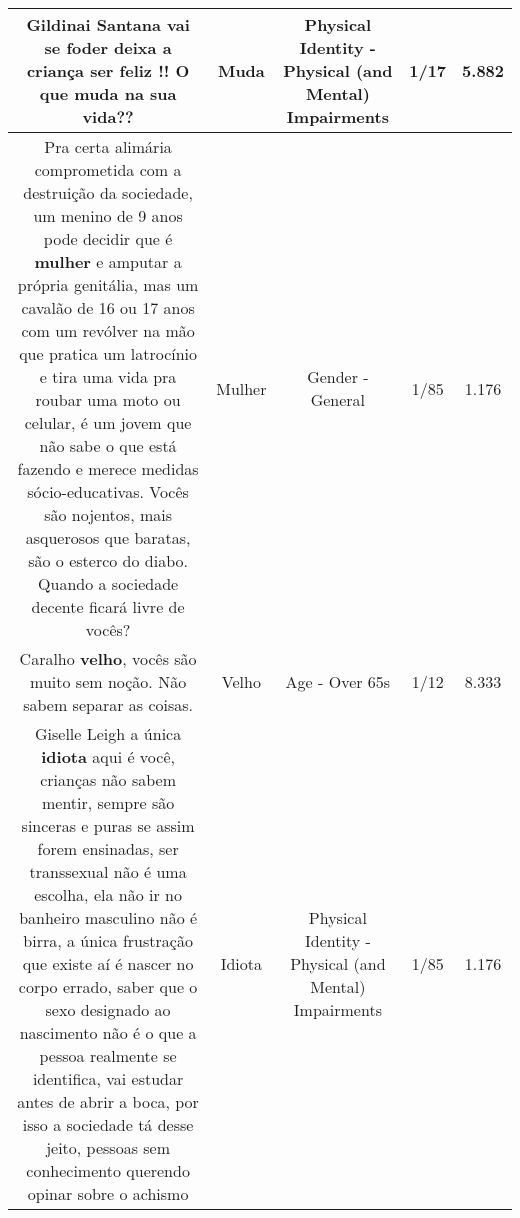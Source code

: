\documentclass[11pt]{article}
\newlength\mylength
\begin{document}
\begin{center}
\begin{longtable}{|C{.65\mylength}|C{.30\mylength}|C{.12\mylength}|C{.12\mylength}|C{.12\mylength}|}
  \small Gildinai Santana vai se foder deixa a criança ser feliz !! O que \textbf{muda} na sua vida??\normalsize   & Muda & Physical Identity - Physical (and Mental) Impairments & 1/17 & 5.882 \\  \hline
  \small Pra certa alimária comprometida com a destruição da sociedade, um menino de 9 anos pode decidir que é \textbf{mulher} e amputar a própria genitália, mas um cavalão de 16 ou 17 anos com um revólver na mão que pratica um latrocínio e tira uma vida pra roubar uma moto ou celular, é um jovem que não sabe o que está fazendo e merece medidas sócio-educativas. Vocês são nojentos, mais asquerosos que baratas, são o esterco do diabo. Quando a sociedade decente ficará livre de vocês?\normalsize   & Mulher & Gender - General & 1/85 & 1.176 \\  \hline
  \small Caralho \textbf{velho}, vocês são muito sem noção. Não sabem separar as coisas.\normalsize   & Velho & Age - Over 65s & 1/12 & 8.333 \\  \hline
  \small Giselle Leigh a única \textbf{idiota} aqui é você, crianças não sabem mentir, sempre são sinceras e puras se assim forem ensinadas, ser transsexual não é uma escolha, ela não ir no banheiro masculino não é birra, a única frustração que existe aí é nascer no corpo errado, saber que o sexo designado ao nascimento não é o que a pessoa realmente se identifica, vai estudar antes de abrir a boca, por isso a sociedade tá desse jeito, pessoas sem conhecimento querendo opinar sobre o achismo\normalsize   & Idiota & Physical Identity - Physical (and Mental) Impairments & 1/85 & 1.176 \\  \hline
  
\end{longtable}
\end{center}
\end{document}

